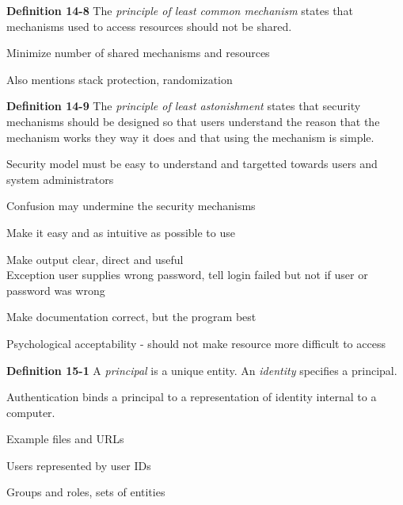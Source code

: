 \documentclass[Screen16to9,17pt]{foils}
\begin{document}

\begin{list1}
\item {\bf Definition 14-8} The \emph{principle of least common mechanism} states that mechanisms used to access resources should not be shared.
\item Minimize number of shared mechanisms and resources
\item Also mentions stack protection, randomization
\end{list1}




\begin{list1}
\item {\bf Definition 14-9} The \emph{principle of least astonishment} states that security mechanisms should be designed so that users understand the reason that the mechanism works they way it does and that using the mechanism is simple.
\item Security model must be easy to understand and targetted towards users and system administrators
\item Confusion may undermine the security mechanisms
\item Make it easy and as intuitive as possible to use
\item Make output clear, direct and useful\\
Exception user supplies wrong password, tell login failed but not if user or password was wrong
\item Make documentation correct, but the program best
\item Psychological acceptability - should not make resource more difficult to access
\end{list1}





\begin{list1}
\item
\item {\bf Definition 15-1} A \emph{principal} is a unique entity. An \emph{identity} specifies a principal.
\item Authentication binds a principal to a representation of identity internal to a computer.
\item Example files and URLs
\item Users represented by user IDs
\item Groups and roles, sets of entities

\end{list1}
\end{document}
